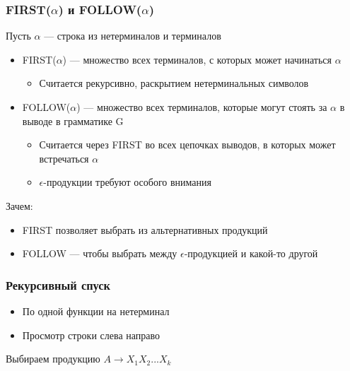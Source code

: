\documentclass{../../slides-style}
\begin{document}
    \begin{frame}
        \frametitle{FIRST($\alpha$) и FOLLOW($\alpha$)}
        Пусть $\alpha$ --- строка из нетерминалов и терминалов
        \begin{itemize}
            \item FIRST($\alpha$) --- множество всех терминалов, с которых может начинаться $\alpha$
            \begin{itemize}
                \item Считается рекурсивно, раскрытием нетерминальных символов
            \end{itemize}
            \item FOLLOW($\alpha$) --- множество всех терминалов, которые могут стоять за $\alpha$ в выводе в грамматике G
            \begin{itemize}
                \item Считается через FIRST во всех цепочках выводов, в которых может встречаться $\alpha$
                \item $\epsilon$-продукции требуют особого внимания
            \end{itemize}
        \end{itemize}
        Зачем:
        \begin{itemize}
            \item FIRST позволяет выбрать из альтернативных продукций
            \item FOLLOW --- чтобы выбрать между $\epsilon$-продукцией и какой-то другой
        \end{itemize}
    \end{frame}

    \begin{frame}[fragile]
        \frametitle{Рекурсивный спуск}
        \begin{itemize}
            \item По одной функции на нетерминал
            \item Просмотр строки слева направо
        \end{itemize}

        \begin{algorithm}[H]
            Выбираем продукцию $A \rightarrow X_1X_2...X_k$\;
        \end{algorithm}
    \end{frame}
\end{document}

